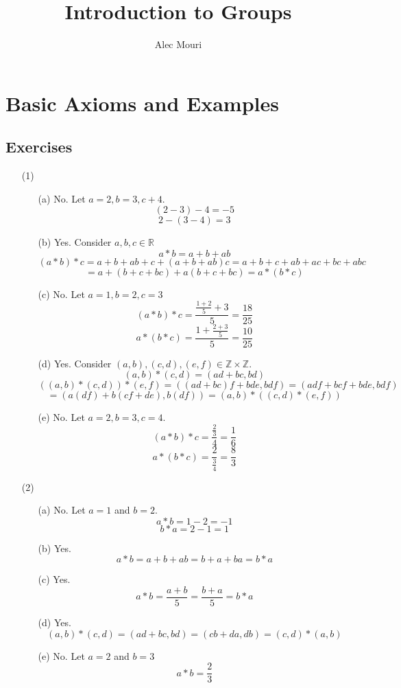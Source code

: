 \documentclass[12pt]{article}
\begin{document}
\title{Introduction to Groups}
\author{Alec Mouri}

\maketitle
\section{Basic Axioms and Examples}
\subsection*{Exercises}
\begin{itemize}
\item[(1)]
\begin{itemize}
\item[(a)] No. Let $a = 2, b = 3, c + 4$.
$$(2 - 3) - 4 = -5$$
$$2 - (3 - 4) = 3$$
\item[(b)] Yes. Consider $a, b, c \in \mathbb{R}$
$$a * b = a + b + ab$$
$$(a * b) * c = a + b + ab + c + (a + b + ab)c = a + b + c + ab + ac + bc + abc$$
$$= a + (b + c + bc) + a(b + c + bc) = a * (b * c)$$
\item[(c)] No. Let $a = 1, b = 2, c = 3$
$$(a * b) * c = \frac{\frac{1 + 2}{5} + 3}{5} = \frac{18}{25}$$
$$a * (b * c) = \frac{1 + \frac{2 + 3}{5}}{5} = \frac{10}{25}$$
\item[(d)] Yes. Consider $(a, b), (c, d), (e, f) \in \mathbb{Z} \times \mathbb{Z}$.
$$(a, b) * (c, d) = (ad + bc, bd)$$
$$((a, b) * (c, d)) * (e, f) = ((ad + bc)f + bde, bdf) = (adf + bcf + bde, bdf)$$
$$= (a(df) + b(cf + de), b(df)) = (a, b) * ((c, d) * (e, f))$$
\item[(e)] No. Let $a = 2, b = 3, c = 4$.
$$(a * b) * c = \frac{\frac{2}{3}}{4} = \frac{1}{6}$$
$$a * (b * c) = \frac{2}{\frac{3}{4}} = \frac{8}{3}$$
\end{itemize}
\item[(2)]
\begin{itemize}
\item[(a)] No. Let $a = 1$ and $b = 2$.
$$a * b = 1 - 2 = -1$$
$$b * a = 2 - 1 = 1$$
\item[(b)]Yes.
$$a * b = a + b + ab = b + a + ba = b * a$$
\item[(c)] Yes.
$$a * b = \frac{a + b}{5} = \frac{b + a}{5} = b * a$$
\item[(d)] Yes.
$$(a, b) * (c, d) = (ad + bc, bd) = (cb + da, db) = (c, d) * (a, b)$$
\item[(e)] No. Let $a = 2$ and $b = 3$
$$a * b = \frac{2}{3}$$

\end{itemize}
\end{itemize}
\end{document}

